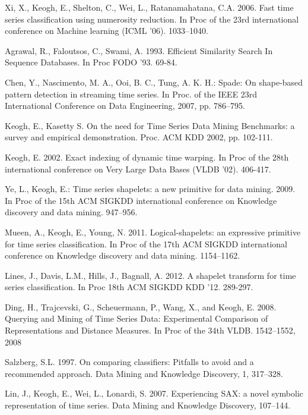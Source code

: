 \documentclass{llncs}
\begin{document}
%
%
\begin{thebibliography}{5}

%

Xi, X., Keogh, E., Shelton, C., Wei, L., Ratanamahatana, C.A. 2006. 
Fast time series classification using numerosity reduction. 
In Proc of the 23rd international conference on Machine learning (ICML '06). 1033--1040.

Agrawal, R., Faloutsos, C., Swami, A. 1993.
Efficient Similarity Search In Sequence Databases.
In Proc FODO '93. 69-84.

Chen, Y., Nascimento, M. A., Ooi, B. C., Tung, A. K. H.:
Spade: On shape-based pattern detection in streaming time series. 
In Proc. of the IEEE 23rd International Conference on Data Engineering, 2007, pp. 786–795.

Keogh, E., Kasetty S. 
On the need for Time Series Data Mining Benchmarks: a survey and empirical demonstration.
Proc. ACM KDD 2002, pp. 102-111.

Keogh, E. 2002. 
Exact indexing of dynamic time warping. 
In Proc of the 28th international conference on Very Large Data Bases (VLDB '02). 406-417.

Ye, L., Keogh, E.:
Time series shapelets: a new primitive for data mining. 2009.
In Proc of the 15th ACM SIGKDD international conference on Knowledge discovery and data
mining. 947--956.

Mueen, A., Keogh, E., Young, N. 2011.
Logical-shapelets: an expressive primitive for time series classification.
In Proc of the 17th ACM SIGKDD international conference on Knowledge discovery and data
mining. 1154--1162.

Lines, J., Davis, L.M., Hills, J., Bagnall, A. 2012.
A shapelet transform for time series classification. 
In Proc 18th ACM SIGKDD KDD '12. 289-297.

Ding, H., Trajcevski, G., Scheuermann, P., Wang, X., and Keogh, E. 2008.
Querying and Mining of Time Series Data: Experimental Comparison of Representations and Distance
Measures. 
In Proc of the 34th VLDB. 1542–1552, 2008

Salzberg, S.L. 1997.
On comparing classifiers: Pitfalls to avoid and a recommended approach. 
Data Mining and Knowledge Discovery, 1, 317–328.

Lin, J., Keogh, E., Wei, L., Lonardi, S. 2007.
Experiencing SAX: a novel symbolic representation of time series.
Data Mining and Knowledge Discovery, 107--144.


\end{thebibliography}
\end{document}
